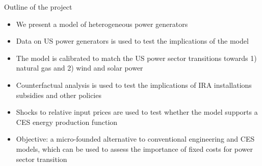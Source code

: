 \documentclass{beamer}
\begin{document}
\begin{frame}{Outline of the project}

\begin{itemize}
    \item We present a model of heterogeneous power generators 
    \item Data on US power generators is used to test the implications of the model
    \item The model is calibrated to match the US power sector transitions towards 1) natural gas and 2) wind and solar power
    \item Counterfactual analysis is used to test the implications of IRA installations subsidies and other policies
    \item Shocks to relative input prices are used to test whether the model supports a CES energy production function
    \item Objective: a micro-founded alternative to conventional engineering and CES models, which can be used to assess the importance of fixed costs for power sector transition
\end{itemize}

    
\end{frame}
\end{document}
